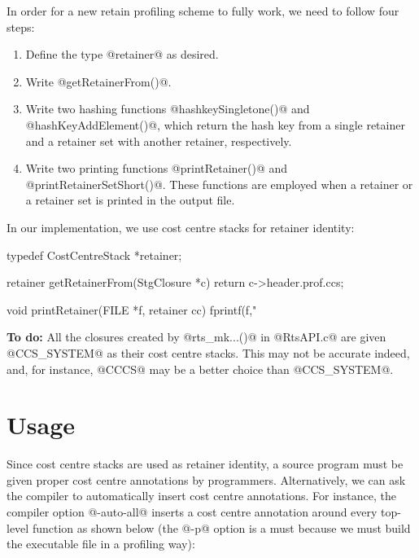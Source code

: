 \documentclass{article}
\begin{document}
In order for a new retain profiling scheme to fully work, we need to follow
four steps:

\begin{enumerate}
\item Define the type @retainer@ as desired.
\item Write @getRetainerFrom()@.
\item Write two hashing functions @hashkeySingletone()@ and 
      @hashKeyAddElement()@, which return the hash key from a single
      retainer and a retainer set with another retainer, respectively.
\item Write two printing functions @printRetainer()@ and 
      @printRetainerSetShort()@.
      These functions are employed when a retainer or a retainer set is
      printed in the output file. 
\end{enumerate}

In our implementation, we use cost centre stacks for retainer identity:

\begin{code}
typedef CostCentreStack *retainer;
\end{code}
\begin{code}
retainer getRetainerFrom(StgClosure *c) { return c->header.prof.ccs; }
\end{code}
\begin{code}
void printRetainer(FILE *f, retainer cc)
{
  fprintf(f,"%
}
\end{code}

\textbf{To do:} All the closures created by @rts_mk...()@ in @RtsAPI.c@ are given 
@CCS_SYSTEM@ as their cost centre stacks. This may not be accurate indeed,
and, for instance, @CCCS@ may be a better choice than @CCS_SYSTEM@. 

\section{Usage}

Since cost centre stacks are used as retainer identity, a source program
must be given proper cost centre annotations by programmers. 
Alternatively,
we can ask the compiler to automatically insert cost centre annotations.
For instance, the compiler option @-auto-all@ inserts a cost centre
annotation around every top-level function as shown below 
(the @-p@ option is a must
because we must build the executable file in a profiling way):

\end{document}
